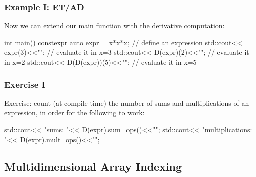 \documentclass[aspectratio=43]{beamer}
\begin{document}
\begin{frame}[fragile]\frametitle{Example I: ET/AD}
  Now we can extend our main function with the derivative computation:
  \begin{Cpplisting}{}
int main(){
  constexpr auto expr = x*x*x; // define an expression
  std::cout<< expr(3)<<"\n"; // evaluate it in x=3
  std::cout<< D(expr)(2)<<"\n"; // evaluate it in x=2
  std::cout<< D(D(expr))(5)<<"\n"; // evaluate it in x=5
}
  \end{Cpplisting}
\end{frame}


\begin{frame}[fragile]\frametitle{Exercise I}
  Exercise: count (at compile time) the number of sums and multiplications of an expression,
  in order for the following to work:

  \begin{Cpplisting}[: Exercise I]{}
std::cout<< "sums: "<< D(expr).sum_ops()<<"\n";
std::cout<< "multiplications: "<< D(expr).mult_ops()<<"\n";
  \end{Cpplisting}
\end{frame}

\subsection{Multidimensional Array Indexing}
\end{document}
